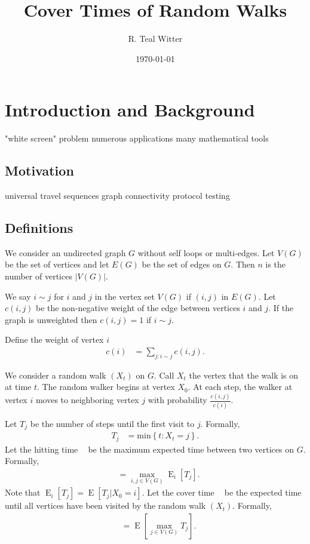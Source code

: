 \documentclass[12pt]{article}
\theoremstyle{definition}
\DeclareMathOperator{\E}{\mathrm{E}}		%
\DeclareMathOperator{\cov}{t_\textrm{cov}}  %
\DeclareMathOperator{\hit}{t_{\textrm{hit}}}%
\begin{document}
\title{Cover Times of Random Walks}


\author{R. Teal Witter}

\date{\today}



\maketitle


\newpage
\tableofcontents

\newpage
\section{Introduction and Background}

"white screen" problem
numerous applications
many mathematical tools

\subsection{Motivation}
universal travel sequences
graph connectivity
protocol testing

\subsection{Definitions}
We consider an undirected graph $G$ without self loops or multi-edges.
Let $V(G)$ be the set of vertices and let $E(G)$ be the set of edges on $G$.
Then $n$ is the number of vertices $|V(G)|$.

We say $i\sim j$ for $i$ and $j$ in the vertex set $V(G)$ if $(i,j)$ in $E(G)$.
Let $c(i,j)$ be the non-negative weight of the edge between vertices $i$ and $j$.
If the graph is unweighted then $c(i,j) = 1$ if $i \sim j$.

Define the weight of vertex $i$ 
\begin{align}
c(i) &= \sum_{j:i \sim j} c(i,j). \nonumber
\end{align}

We consider a random walk $(X_t)$ on $G$.
Call $X_t$ the vertex that the walk is on at time $t$.
The random walker begins at vertex $X_0$.
At each step, the walker at vertex $i$ moves to neighboring vertex
$j$ with probability $\frac{c(i,j)}{c(i)}$.

Let $T_{j}$ be the number of steps until the first visit to $j$.
Formally,
\begin{align}
T_{j} &= \textrm{min} \left\{t : X_t = j \right\}. \nonumber
\end{align}
Let the hitting time $\hit$ be the maximum expected time between two vertices on $G$.
Formally, 
\begin{align}
\hit &= \max_{i,j \in V(G)} \E_i[T_j]. \nonumber
\end{align}
Note that $\E_i[T_j] = \E[T_j | X_0 = i]$.
Let the cover time $\cov$ be the expected time until all vertices have been
visited by the random walk $(X_t)$.
Formally,
\begin{align}
\cov &= \E [ \max_{j \in V(G)} T_j ]. \nonumber
\end{align}
\end{document}
